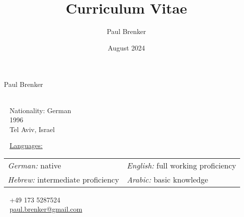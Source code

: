 \documentclass{style/modernsimplecv}
\title{Curriculum Vitae}
\author{Paul Brenker}
\date{August 2024}
\begin{document}
\thispagestyle{empty}




\begin{minipage}[t]{0.21\textwidth}
    \vspace{0pt} %
\end{minipage}
\hfill
\begin{minipage}[t]{1\textwidth}
    \vspace{0pt} %
    \begin{shaded*}

        \begin{minipage}[t]{0.47\textwidth}
            \vspace{0pt} %
            {\par\centering\huge{Paul Brenker}} \\[0.3cm]
            \faGlobe~ Nationality: German\\
            \faBirthdayCake~ 1996 \\
            \faMapMarker~ Tel Aviv, Israel \\
            \begin{spacing}{0.5}
                {
                    \faCommentsO~ \underline{Languages:} \\
                    \begin{tabular}{l l}
                        \emph{German:} native & \emph{English:} full working proficiency \\
                        \emph{Hebrew:} intermediate proficiency & \emph{Arabic:} basic knowledge \\
                    \end{tabular}
                }
            \end{spacing}
            \vspace{4pt} %
        \end{minipage}\hfill
        \begin{minipage}[t]{0.36\textwidth}
            \vspace{29pt} %
            \faPhone~ +49 173 5287524 \\
            \faAt~ \protect\url{paul.brenker@gmail.com} \\


\end{minipage}
\end{shaded*}
\end{minipage}
\end{document}
